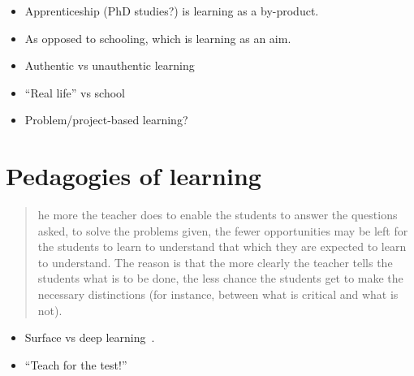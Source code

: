 \begin{frame}
  \begin{example}
    \begin{itemize}
      \item Apprenticeship (PhD studies?) is learning as a by-product.
      \item As opposed to schooling, which is learning as an aim.
    \end{itemize}
  \end{example}

  \pause

  \begin{example}
    \begin{itemize}
      \item Authentic vs unauthentic learning
      \item \enquote{Real life} vs school
      \item Problem/project-based learning?
    \end{itemize}
  \end{example}
\end{frame}


\section{Pedagogies of learning}

\begin{frame}
  \begin{example}
    \blockcquote[p.~13]{NecessaryConditionsOfLearning}{%
      he more the teacher does to enable the students to answer the 
      questions asked, to solve the problems given, the fewer opportunities may 
      be left for the students to learn to understand that which they are 
      expected to learn to understand. The reason is that the more clearly the 
      teacher tells the students what is to be done, the less chance the 
      students get to make the necessary distinctions (for instance, between 
      what is critical and what is not).%
    }
  \end{example}

  \pause

  \begin{remark}
    \begin{itemize}
      \item Surface vs deep learning~\cite{DeepSurfaceLearning}.
      \item \enquote{Teach for the test!}
    \end{itemize}
  \end{remark}
\end{frame}

